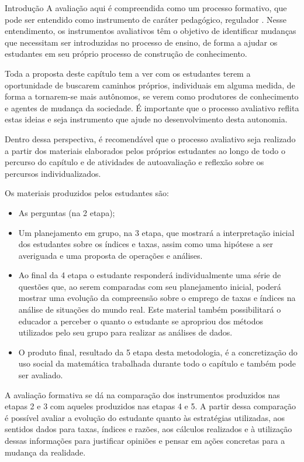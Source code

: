 \begin{apresentacao}{Introdução}
A avaliação aqui é compreendida como um processo formativo, que pode ser entendido como instrumento de caráter pedagógico, regulador \citep{sanmarti2009}. Nesse entendimento, os instrumentos avaliativos têm o objetivo de identificar mudanças que necessitam ser introduzidas no processo de ensino, de forma a ajudar os estudantes em seu próprio processo de construção de conhecimento. 

Toda a proposta deste capítulo tem a ver com os estudantes terem a oportunidade de buscarem caminhos próprios, individuais em alguma medida, de forma a tornarem-se mais autônomos, se verem como produtores de conhecimento e agentes de mudança da sociedade. É importante que o processo avaliativo reflita estas ideias e seja instrumento que ajude no desenvolvimento desta autonomia. 

Dentro dessa perspectiva, é recomendável que o processo avaliativo seja realizado a partir dos materiais elaborados pelos próprios estudantes ao longo de todo o percurso do capítulo e de atividades de autoavaliação e reflexão sobre os percursos individualizados. 

Os materiais produzidos pelos estudantes são: 
\begin{itemize}
\item As perguntas (na 2 etapa);
\item Um planejamento em grupo, na 3 etapa, que mostrará a interpretação inicial dos estudantes sobre os índices e taxas, assim como uma hipótese a ser averiguada e uma proposta de operações e análises.
\item Ao final da 4 etapa o estudante responderá individualmente uma série de questões que, ao serem comparadas com seu planejamento inicial, poderá mostrar uma evolução da compreensão sobre o emprego de taxas e índices na análise de situações do mundo real. Este material também possibilitará o educador a perceber o quanto o estudante se apropriou dos métodos utilizados pelo seu grupo para realizar as análises de dados. 
\item O produto final, resultado da 5 etapa desta metodologia, é a concretização do uso social da matemática trabalhada durante todo o capítulo e também pode ser avaliado.
\end{itemize}

A avaliação formativa se dá na comparação dos instrumentos produzidos nas etapas 2 e 3 com aqueles produzidos nas etapas 4 e 5. A partir dessa comparação é possível avaliar a evolução do estudante quanto às estratégias utilizadas, aos sentidos dados para taxas, índices e razões, aos cálculos realizados e à utilização dessas informações para justificar opiniões e pensar em ações concretas para a mudança da realidade. 


\end{apresentacao}
